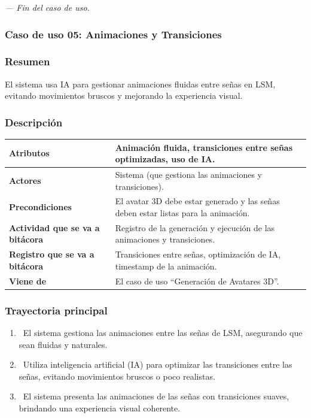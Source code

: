 \textit{--- Fin del caso de uso.}
\newpage
\subsubsection{Caso de uso 05: Animaciones y Transiciones}
\subsubsection{Resumen}
El sistema usa IA para gestionar animaciones fluidas entre señas en LSM, evitando movimientos bruscos y mejorando la experiencia visual.
\subsubsection{Descripción}
\begin{table}[h]
    \centering
    \begin{longtable}{|l|p{10cm}|}  %
    \hline
    \textbf{Atributos} & Animación fluida, transiciones entre señas optimizadas, uso de IA. \\ \hline
    \textbf{Actores} & Sistema (que gestiona las animaciones y transiciones). \\ \hline
    \textbf{Precondiciones} & El avatar 3D debe estar generado y las señas deben estar listas para la animación. \\ \hline
    \textbf{Actividad que se va a bitácora} & Registro de la generación y ejecución de las animaciones y transiciones. \\ \hline
    \textbf{Registro que se va a bitácora} & Transiciones entre señas, optimización de IA, timestamp de la animación. \\ \hline
    \textbf{Viene de} & El caso de uso “Generación de Avatares 3D”. \\ \hline
      
    \end{longtable}
\end{table}
    
\subsubsection{Trayectoria principal}
\begin{enumerate}[label=\textbf{\arabic*}, leftmargin=1.5cm]
    \item \UCsystem \ El sistema gestiona las animaciones entre las señas de LSM, asegurando que sean fluidas y naturales.
    
    \item \UCsystem \ Utiliza inteligencia artificial (IA) para optimizar las transiciones entre las señas, evitando movimientos bruscos o poco realistas.
    
    \item \UCsystem \ El sistema presenta las animaciones de las señas con transiciones suaves, brindando una experiencia visual coherente.

\end{enumerate}

